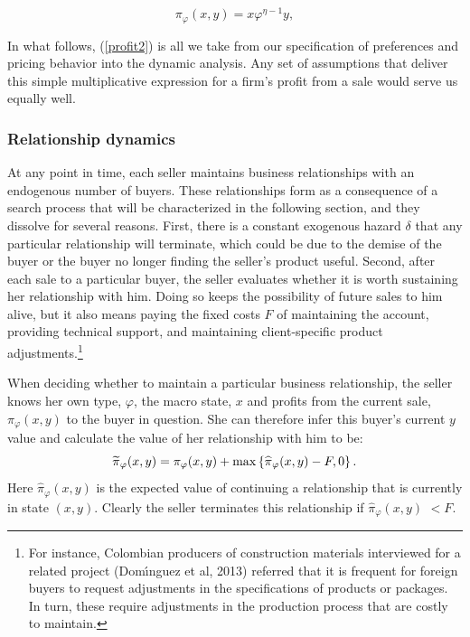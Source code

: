 \documentclass[12pt]{article}
\begin{document}
\begin{equation}
\pi _{\varphi }(x,y)=x\varphi ^{\eta -1}y,  \label{profit2}
\end{equation}
\qquad \qquad

In what follows, (\ref{profit2}) is all we take from our specification of
preferences and pricing behavior into the dynamic analysis. Any set of
assumptions that deliver this simple multiplicative expression for a firm's
profit from a sale would serve us equally well.

\subsubsection{Relationship dynamics}

At any point in time, each seller maintains business relationships with an
endogenous number of buyers. These relationships form as a consequence of a
search process that will be characterized in the following section, and they
dissolve for several reasons. First, there is a constant exogenous hazard $%
\delta $ that any particular relationship will terminate, which could be due
to the demise of the buyer or the buyer no longer finding the seller's
product useful. Second, after each sale to a particular buyer, the seller
evaluates whether it is worth sustaining her relationship with him. Doing so
keeps the possibility of future sales to him alive, but it also means paying
the fixed costs $F$ of maintaining the account, providing technical support,
and maintaining client-specific product adjustments.\footnote{%
For instance, Colombian producers of construction materials interviewed for
a related project (Dom\'{\i}nguez et al, 2013) referred that it is frequent
for foreign buyers to request adjustments in the specifications of products
or packages. In turn, these require adjustments in the production process
that are costly to maintain.}

When deciding whether to maintain a particular business relationship, the
seller knows her own type, $\varphi $, the macro state, $x$ and profits from
the current sale, $\pi _{\varphi }(x,y)$ to the buyer in question. She can
therefore infer this buyer's current $y$ value and calculate the value of
her relationship with him to be:%
\begin{equation*}
\widetilde{\pi }_{\varphi }(x,y)=\pi _{\varphi }(x,y)+\max \left\{ \widehat{%
\pi }_{\varphi }(x,y)-F,0\right\} .
\end{equation*}%
Here $\widehat{\pi }_{\varphi }(x,y)$ is the expected value of continuing a
relationship that is currently in state $(x,y).$ Clearly the seller
terminates this relationship if $\widehat{\pi }_{\varphi }(x,y)$ $<F.$
\end{document}
